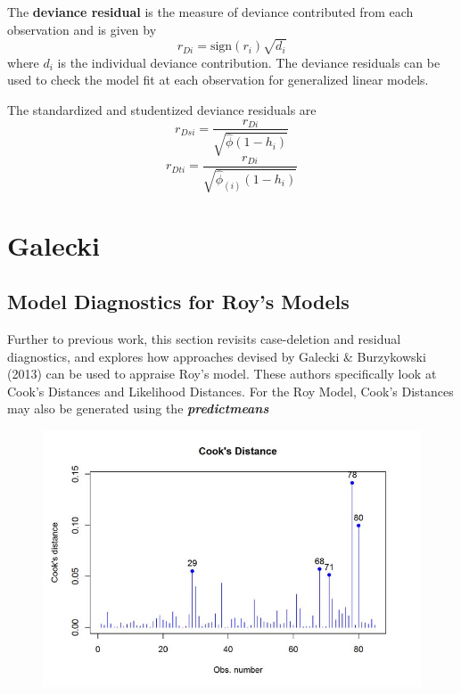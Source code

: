 \documentclass[12pt, a4paper]{report}
\theoremstyle{plain}
\theoremstyle{definition}
\theoremstyle{remark}
\begin{document}
	
	
	
	
	The \textbf{deviance residual} is the measure of deviance contributed from each observation and is given by
	\[r_{Di} = \textrm{sign}( r_{i})
	\sqrt{ d_{i}}\]
	where $d_i$ is the individual deviance contribution.
	The deviance residuals can be used to check the model fit at each observation for generalized linear models. 
	
	
	The standardized and studentized deviance residuals are
	\[
	r_{Dsi} = \frac{r_{Di}}{\sqrt{\hat{ \phi} (1- h_{i})} }\]
	\[r_{Dti} = \frac{r_{Di}}{\sqrt{ \hat{ \phi}_{(i)}
			(1- h_{i})}}\]
	
	
	

\chapter{Galecki}
\section{Model Diagnostics for Roy's Models}

Further to previous work, this section revisits case-deletion and residual diagnostics, and explores how approaches devised by  Galecki \& Burzykowski (2013) can be used to appraise Roy's model. These authors specifically look at Cook's Distances and Likelihood Distances.
For the Roy Model, Cook's Distances may also be generated using the \textbf{\textit{predictmeans}}



\begin{figure}[h!]
	\centering
	\includegraphics[width=0.7\linewidth]{images/CooksDistancePlot-JS-Roy}
	\caption{}
	\label{fig:CooksDistancePlot-JS-Roy}
\end{figure}
\end{document}
